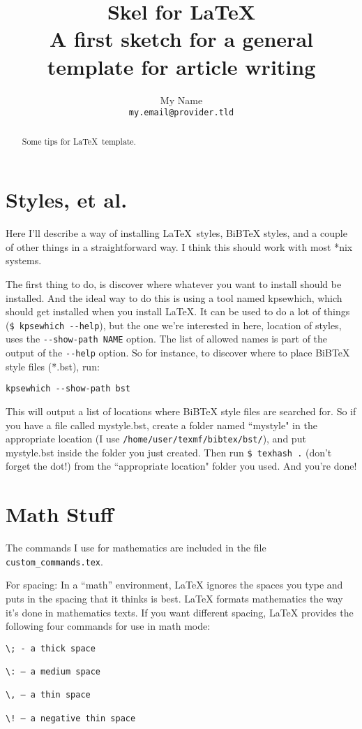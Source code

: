 \documentclass[a4paper,10pt,twocolumn]{article}
\title{\large\textbf{\huge Skel for \LaTeX}\\A first sketch for a general 
template for article writing}
\author{My Name\\\texttt{my.email@provider.tld}}
\date{}
\begin{document}
\maketitle              %


\begin{abstract}
	Some tips for \LaTeX\ template.
\end{abstract}

\section{Styles, et al.}
Here I’ll describe a way of installing \LaTeX\ styles, BiBTeX styles, and a couple 
of other things in a straightforward way. I think this should work with most 
*nix systems.

The first thing to do, is discover where whatever you want to install should be 
installed. And the ideal way to do this is using a tool named kpsewhich, which 
should get installed when you install LaTeX. It can be used to do a lot of 
things\\(\verb+$ kpsewhich --help+), but the one we’re interested in here, 
location of styles, uses the \verb+--show-path NAME+ option. The list of allowed names 
is part of the output of the \verb+--help+ option. So for instance, to discover where to place 
BiBTeX style files (*.bst), run:
\begin{verbatim}
kpsewhich --show-path bst
\end{verbatim}
This will output a list of locations where BiBTeX style files are searched for. 
So if you have a file called mystyle.bst, create a folder named ``mystyle" in the 
appropriate location (I use \verb+/home/user/texmf/bibtex/bst/+), and put mystyle.bst 
inside the folder you just created. Then run \verb+$ texhash .+ (don’t forget the 
dot!) from the ``appropriate location" folder you used. And you're done!

\section{Math Stuff}
The commands I use for mathematics are included in the file 
\texttt{custom\_commands.tex}.

For spacing: In a ``math'' environment, LaTeX ignores the spaces you type 
and puts in the spacing that it thinks is best. LaTeX formats mathematics the
way it’s done in mathematics texts. If you want different spacing, LaTeX 
provides the following four commands for use in math mode:

\begin{verbatim}
\; - a thick space

\: – a medium space

\, – a thin space

\! – a negative thin space 
\end{verbatim}

\end{document}
